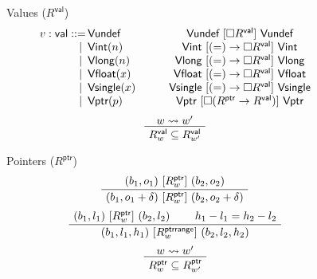 \documentclass[acmsmall,anonymous]{acmart}
\newcommand{\kw}[1]{\ensuremath{ \textsf{#1} }}
\newcommand{\ifr}[1]{\ [{#1}]\ }
\newcommand{\alt}{\ |\ }
\begin{document}
\begin{figure}
  Values ($R^\kw{val}$)
  \vspace{1em}
  \[
    \begin{array}{r@{\,}l@{\hspace{3em}}c}
      v : \kw{val} ::= &
        \kw{Vundef} &
        \kw{Vundef} \ifr{\Box R^\kw{val}} \kw{Vundef} \\
      \alt &
        \kw{Vint}(n) &
        \kw{Vint} \ifr{(=) \rightarrow \Box R^\kw{val}} \kw{Vint} \\
      \alt &
        \kw{Vlong}(n) &
        \kw{Vlong} \ifr{(=) \rightarrow \Box R^\kw{val}} \kw{Vlong} \\
      \alt &
        \kw{Vfloat}(x) &
        \kw{Vfloat} \ifr{(=) \rightarrow \Box R^\kw{val}} \kw{Vfloat} \\
      \alt &
        \kw{Vsingle}(x) &
        \kw{Vsingle} \ifr{(=) \rightarrow \Box R^\kw{val}} \kw{Vsingle} \\
      \alt &
        \kw{Vptr}(p) &
        \kw{Vptr} \ifr{\Box (R^\kw{ptr} \rightarrow R^\kw{val})} \kw{Vptr}
    \end{array}
  \]
  \vspace{1em}
  \[
    \AxiomC{$w \leadsto w'$}
    \UnaryInfC{$R^\kw{val}_w \subseteq R^\kw{val}_{w'}$}
    \DisplayProof
  \]

  \vspace{2em}
  Pointers ($R^\kw{ptr}$)
  \vspace{1em}
  \[
    \AxiomC{$(b_1, o_1) \ifr{R^\kw{ptr}_w} (b_2, o_2)$}
    \UnaryInfC{$(b_1, o_1 + \delta) \ifr{R^\kw{ptr}_w} (b_2, o_2 + \delta)$}
    \DisplayProof
  \]
  \vspace{1em}
  \[
    \AxiomC{$(b_1, l_1) \ifr{R^\kw{ptr}_w} (b_2, l_2)$}
    \AxiomC{$h_1 - l_1 = h_2 - l_2$}
    \BinaryInfC{$(b_1, l_1, h_1) \ifr{R^\kw{ptrrange}_w} (b_2, l_2, h_2)$}
    \DisplayProof
  \]
  \vspace{1em}
  \[
    \AxiomC{$w \leadsto w'$}
    \UnaryInfC{$R^\kw{ptr}_w \subseteq R^\kw{ptr}_{w'}$}
    \DisplayProof
  \]


\end{figure}
\end{document}
